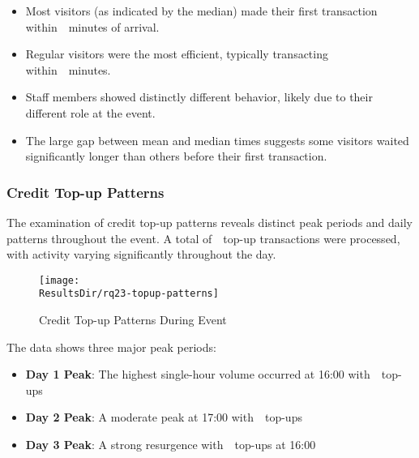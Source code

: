 \begin{keytakeaways}
	\begin{itemize}
		\item Most visitors (as indicated by the median) made their first transaction within~~minutes of arrival.
		\item Regular visitors were the most efficient, typically transacting within~~minutes.
		\item Staff members showed distinctly different behavior, likely due to their different role at the event.
		\item The large gap between mean and median times suggests some visitors waited significantly longer than others before their first transaction.
	\end{itemize}
\end{keytakeaways}


\subsubsection{Credit Top-up Patterns}
\label{subsubsec:analysis-credit-topup}


The examination of credit top-up patterns reveals distinct peak periods and daily patterns throughout the event.
A total of~~top-up transactions were processed, with activity varying significantly throughout the day.

\begin{figure}[H]
	\centering
	\texttt{[image: \\ResultsDir/rq23-topup-patterns]}
	\caption{Credit Top-up Patterns During Event}
	\label{fig:topup-patterns}
	\source
\end{figure}

The data shows three major peak periods:
\begin{itemize}
	\item \textbf{Day 1 Peak}: The highest single-hour volume occurred at 16:00 with~~top-ups
	\item \textbf{Day 2 Peak}: A moderate peak at 17:00 with~~top-ups
	\item \textbf{Day 3 Peak}: A strong resurgence with~~top-ups at 16:00
\end{itemize}

